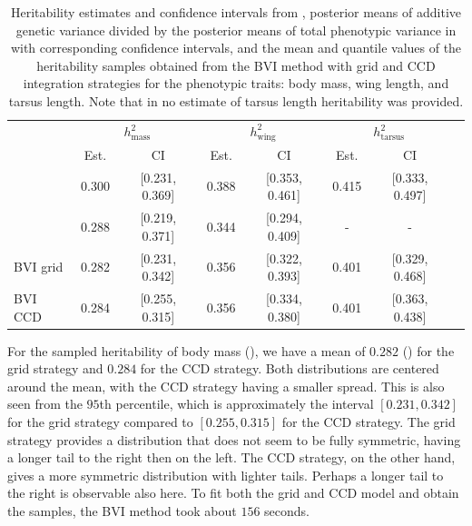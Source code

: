 \begin{table}[H]
  \centering
  \small
  \begin{tabular}{lccccccc}
    \toprule
    & \multicolumn{2}{c}{$h^2_{\text{mass}}$} & \multicolumn{2}{c}{$h^2_{\text{wing}}$} & \multicolumn{2}{c}{$h^2_{\text{tarsus}}$} \\
    \cmidrule(lr){2-3} \cmidrule(lr){4-5} \cmidrule(lr){6-7}
    & Est. & CI & Est. & CI & Est. & CI \\
    \midrule
    \citet{Silva2017} & 0.300 & [0.231, 0.369] & 0.388 & [0.353, 0.461] & 0.415 & [0.333, 0.497] \\
    \citet{Muff2019Genetic} & 0.288 & [0.219, 0.371] & 0.344 & [0.294, 0.409] & - & - \\
    BVI grid & 0.282 & [0.231, 0.342] & 0.356 & [0.322, 0.393] & 0.401 & [0.329, 0.468] \\
    BVI CCD & 0.284 & [0.255, 0.315] & 0.356 & [0.334, 0.380] & 0.401 & [0.363, 0.438] \\
    \bottomrule
  \end{tabular}
  \caption[Heritability estimates and confidence intervals]{Heritability estimates and confidence intervals from \citet{Silva2017}, posterior means of additive genetic variance divided by the posterior means of total phenotypic variance in \citet{Muff2019Genetic} with corresponding confidence intervals, and the mean and quantile values of the heritability samples obtained from the BVI method with grid and CCD integration strategies for the phenotypic traits: body mass, wing length, and tarsus length. Note that in \citet{Muff2019Genetic} no estimate of tarsus length heritability was provided.}
  \label{table:summary_heritability}
\end{table}
\noindent For the sampled heritability of body mass (), we have a mean of $0.282$ () for the grid strategy and $0.284$ for the CCD strategy. Both distributions are centered around the mean, with the CCD strategy having a smaller spread. This is also seen from the $95$th percentile, which is approximately the interval $[0.231, 0.342]$ for the grid strategy compared to $[0.255, 0.315]$ for the CCD strategy. The grid strategy provides a distribution that does not seem to be fully symmetric, having a longer tail to the right then on the left. The CCD strategy, on the other hand, gives a more symmetric distribution with lighter tails. Perhaps a longer tail to the right is observable also here. To fit both the grid and CCD model and obtain the samples, the BVI method took about $156$ seconds.
